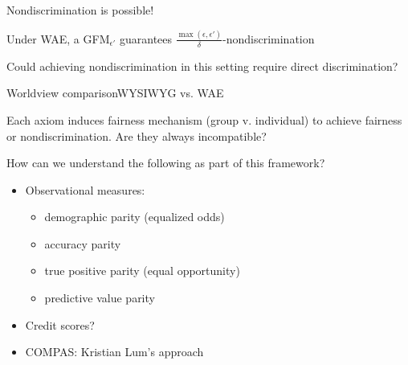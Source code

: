 \documentclass{beamer}
\newcommand{\cO}{\mathcal{O}}
\newcommand{\cC}{\mathcal{C}}
\newcommand{\cD}{\mathcal{D}}
\begin{document}
\begin{frame}{Nondiscrimination is possible!}
\begin{tcolorbox}
\begin{theorem}
Under {\color{red}WAE}, a {\color{blue}GFM$_{\epsilon'}$} guarantees $\frac{\max{(\epsilon,\epsilon')}}{\delta} $-{\color{green}nondiscrimination}
\end{theorem}
\end{tcolorbox}
\begin{center}
\end{center}

\pause
Could achieving nondiscrimination in this setting require direct discrimination?

\end{frame}




\begin{frame}{Worldview comparison}{WYSIWYG vs. WAE}

Each axiom induces fairness mechanism (group v. individual) to achieve fairness or nondiscrimination. Are they always incompatible?

\pause 
\vspace{0.5cm}
How can we understand the following as part of this framework?
\begin{itemize}
  \item Observational measures: \begin{itemize}
    \item demographic parity (equalized odds)
    \item accuracy parity 
    \item true positive parity (equal opportunity)
    \item predictive value parity 
  \end{itemize}
  \item Credit scores?
  \item COMPAS: Kristian Lum's approach
\end{itemize}


\end{frame}
\end{document}
